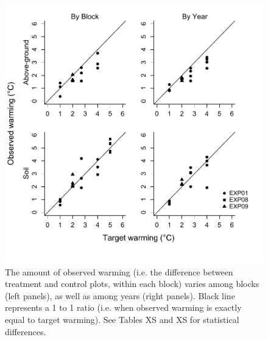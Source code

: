\documentclass{article}
\begin{document}
\begin{figure}[h]
     \centering
 \includegraphics{../Analyses/figures/BothWarmingbyblockyear.pdf}    
 \caption{The amount of observed warming (i.e. the difference between treatment and control plots, within each block) varies among blocks (left panels), as well as among years (right panels). Black line represents a 1 to 1 ratio (i.e. when observed warming is exactly equal to target warming). See Tables XS and XS for statistical differences.}
  \label{fig:blockyear}

 \end{figure}
\clearpage
\end{document}
